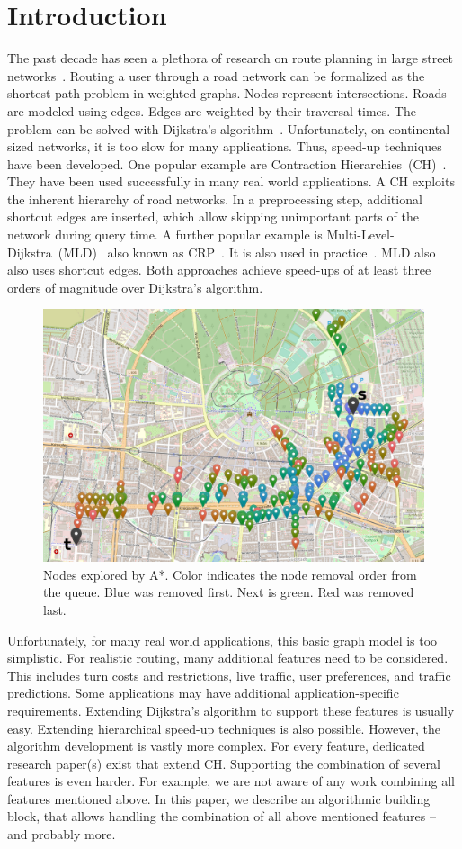\documentclass[a4paper,USenglish,cleveref, autoref, thm-restate]{lipics-v2019}
\begin{document}
\section{Introduction}
\label{sec:intro}
The past decade has seen a plethora of research on route planning in large street networks~\cite{bdgmpsww-rptn-16}.
Routing a user through a road network can be formalized as the shortest path problem in weighted graphs.
Nodes represent intersections.
Roads are modeled using edges.
Edges are weighted by their traversal times.
The problem can be solved with Dijkstra's algorithm~\cite{d-ntpcg-59}.
Unfortunately, on continental sized networks, it is too slow for many applications.
Thus, speed-up techniques have been developed.
One popular example are Contraction Hierarchies~(CH)~\cite{gssv-erlrn-12}.
They have been used successfully in many real world applications.
A CH exploits the inherent hierarchy of road networks.
In a preprocessing step, additional shortcut edges are inserted, which allow skipping unimportant parts of the network during query time.
A further popular example is Multi-Level-Dijkstra~(MLD)~\cite{swz-umlgt-02} also known as CRP~\cite{dgpw-crprn-13}.
It is also used in practice~.
MLD also also uses shortcut edges.
Both approaches achieve speed-ups of at least three orders of magnitude over Dijkstra's algorithm.

\begin{figure}
\centering
\includegraphics[width=.6\columnwidth]{fig/searchspace_st.png}
\caption{Nodes explored by A*. Color indicates the node removal order from the queue. Blue was removed first. Next is green. Red was removed last.}
\label{img:search-space}
\end{figure}

Unfortunately, for many real world applications, this basic graph model is too simplistic.
For realistic routing, many additional features need to be considered.
This includes turn costs and restrictions, live traffic, user preferences, and traffic predictions.%
Some applications may have additional application-specific requirements.
Extending Dijkstra's algorithm to support these features is usually easy.
Extending hierarchical speed-up techniques is also possible.
However, the algorithm development is vastly more complex.
For every feature, dedicated research paper(s) exist that extend CH.
Supporting the combination of several features is even harder.
For example, we are not aware of any work combining all features mentioned above.
In this paper, we describe an algorithmic building block, that allows handling the combination of all above mentioned features -- and probably more.
\end{document}
